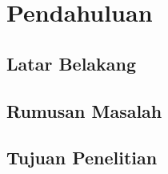\chapter{Pendahuluan}


\section{Latar Belakang}

%

\section{Rumusan Masalah}

%

\section{Tujuan Penelitian}

